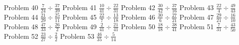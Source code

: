\documentclass{article}
\begin{document}
\newline
\hfill \break
Problem 40
\newline
\hfill \break
$\displaystyle \frac{7}{24} \div \frac{37}{39}$
\newline
\hfill \break
Problem 41
\newline
\hfill \break
$\displaystyle \frac{10}{41} \div \frac{22}{31}$
\newline
\hfill \break
Problem 42
\newline
\hfill \break
$\displaystyle \frac{30}{42} \div \frac{37}{16}$
\newline
\hfill \break
Problem 43
\newline
\hfill \break
$\displaystyle \frac{22}{4} \div \frac{49}{43}$
\newline
\hfill \break
Problem 44
\newline
\hfill \break
$\displaystyle \frac{21}{29} \div \frac{25}{11}$
\newline
\hfill \break
Problem 45
\newline
\hfill \break
$\displaystyle \frac{22}{7} \div \frac{13}{18}$
\newline
\hfill \break
Problem 46
\newline
\hfill \break
$\displaystyle \frac{30}{6} \div \frac{27}{21}$
\newline
\hfill \break
Problem 47
\newline
\hfill \break
$\displaystyle \frac{29}{21} \div \frac{16}{10}$
\newline
\hfill \break
Problem 48
\newline
\hfill \break
$\displaystyle \frac{47}{33} \div \frac{26}{2}$
\newline
\hfill \break
Problem 49
\newline
\hfill \break
$\displaystyle \frac{2}{41} \div \frac{21}{41}$
\newline
\hfill \break
Problem 50
\newline
\hfill \break
$\displaystyle \frac{18}{18} \div \frac{38}{41}$
\newline
\hfill \break
Problem 51
\newline
\hfill \break
$\displaystyle \frac{7}{31} \div \frac{43}{50}$
\newline
\hfill \break
Problem 52
\newline
\hfill \break
$\displaystyle \frac{23}{27} \div \frac{2}{2}$
\newline
\hfill \break
Problem 53
\newline
\hfill \break
$\displaystyle \frac{46}{35} \div \frac{5}{14}$
\newline
\end{document}
